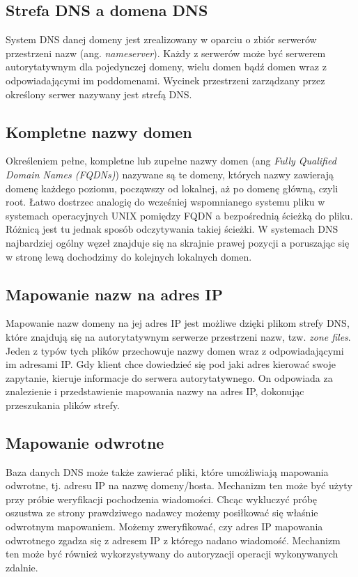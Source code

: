 \subsection{Strefa DNS a domena DNS}
System DNS danej domeny jest zrealizowany w oparciu o zbiór serwerów przestrzeni nazw (ang. \textit{nameserver}). Każdy z serwerów może być serwerem autorytatywnym dla pojedynczej domeny, wielu domen bądź domen wraz z odpowiadającymi im poddomenami. Wycinek przestrzeni zarządzany przez określony serwer nazywany jest strefą DNS.


\subsection{Kompletne nazwy domen}
\label{sec:FQDN}
Określeniem pełne, kompletne lub zupełne nazwy domen (ang \textit{Fully Qualified Domain Names (FQDNs)}) nazywane są te domeny, których nazwy zawierają domenę każdego poziomu, począwszy od lokalnej, aż po domenę główną, czyli root. Łatwo dostrzec analogię do wcześniej wspomnianego systemu pliku w systemach operacyjnych UNIX pomiędzy FQDN a bezpośrednią ścieżką do pliku. Różnicą jest tu jednak sposób odczytywania takiej ścieżki. W systemach DNS najbardziej ogólny węzeł znajduje się na skrajnie prawej pozycji a poruszając się w stronę lewą dochodzimy do kolejnych lokalnych domen.

\subsection{Mapowanie nazw na adres IP}
\label{mapping}
Mapowanie nazw domeny na jej adres IP jest możliwe dzięki plikom strefy DNS, które znajdują się na autorytatywnym serwerze przestrzeni nazw, tzw. \textit{zone files}. Jeden z typów tych plików przechowuje nazwy domen wraz z odpowiadającymi im adresami IP. Gdy klient chce dowiedzieć się pod jaki adres kierować swoje zapytanie, kieruje informacje do serwera autorytatywnego. On odpowiada za znalezienie i przedstawienie mapowania nazwy na adres IP, dokonując przeszukania plików strefy.

\subsection{Mapowanie odwrotne}
\label{revmapping}
Baza danych DNS może także zawierać pliki, które umożliwiają mapowania odwrotne, tj. adresu IP na nazwę domeny/hosta. Mechanizm ten może być użyty przy próbie weryfikacji pochodzenia wiadomości. Chcąc wykluczyć próbę oszustwa ze strony prawdziwego nadawcy możemy posiłkować się właśnie odwrotnym mapowaniem. Możemy zweryfikować, czy adres IP mapowania odwrotnego zgadza się z adresem IP z którego nadano wiadomość. Mechanizm ten może być również wykorzystywany do autoryzacji operacji wykonywanych zdalnie.


